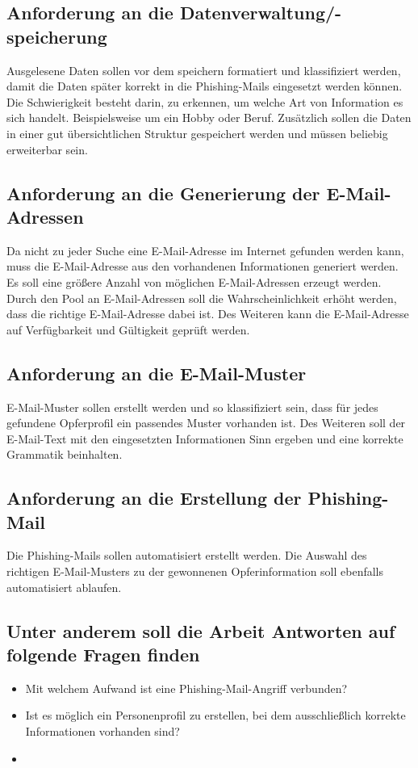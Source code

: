 	\subsection{Anforderung an die Datenverwaltung/-speicherung}
	Ausgelesene Daten sollen vor dem speichern formatiert und klassifiziert werden, damit die Daten später korrekt in die Phishing-Mails eingesetzt werden können. Die Schwierigkeit besteht darin, zu erkennen, um welche Art von Information es sich handelt. Beispielsweise um ein Hobby oder Beruf. Zusätzlich sollen die Daten in einer gut übersichtlichen Struktur gespeichert werden und müssen beliebig erweiterbar sein.
	
	\subsection{Anforderung an die Generierung der E-Mail-Adressen}
	Da nicht zu jeder Suche eine E-Mail-Adresse im Internet gefunden werden kann, muss die E-Mail-Adresse aus den vorhandenen Informationen generiert werden. Es soll eine größere Anzahl von möglichen E-Mail-Adressen erzeugt werden. Durch den Pool an E-Mail-Adressen soll die Wahrscheinlichkeit erhöht werden, dass die richtige E-Mail-Adresse dabei ist. Des Weiteren kann die E-Mail-Adresse auf Verfügbarkeit und Gültigkeit geprüft werden.
	
	\subsection{Anforderung an die E-Mail-Muster}
	E-Mail-Muster sollen erstellt werden und so klassifiziert sein, dass für jedes gefundene Opferprofil ein passendes Muster vorhanden ist. Des Weiteren soll der E-Mail-Text mit den eingesetzten Informationen Sinn ergeben und eine korrekte Grammatik beinhalten.
	
	\subsection{Anforderung an die Erstellung der Phishing-Mail}
	Die Phishing-Mails sollen automatisiert erstellt werden. Die Auswahl des richtigen E-Mail-Musters zu der gewonnenen Opferinformation soll ebenfalls automatisiert ablaufen.
	
	\subsection{Unter anderem soll die Arbeit Antworten auf folgende Fragen finden}
	\begin{itemize}
		\item Mit welchem Aufwand ist eine Phishing-Mail-Angriff verbunden?
		\item Ist es möglich ein Personenprofil zu erstellen, bei dem ausschließlich korrekte Informationen vorhanden sind?
		\item 
	\end{itemize}
\FloatBarrier


